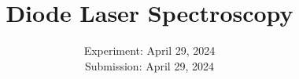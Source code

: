 

\subject{\texorpdfstring{\vspace{2ex}}{}V60\texorpdfstring{\vspace{-2ex}}{}} %
\title{Diode Laser Spectroscopy} %
\date{
	Experiment: April 29, 2024 %
	\\ Submission: April 29, 2024 %
}




\maketitle
\thispagestyle{empty}


\tableofcontents
\newpage








\printbibliography{}


